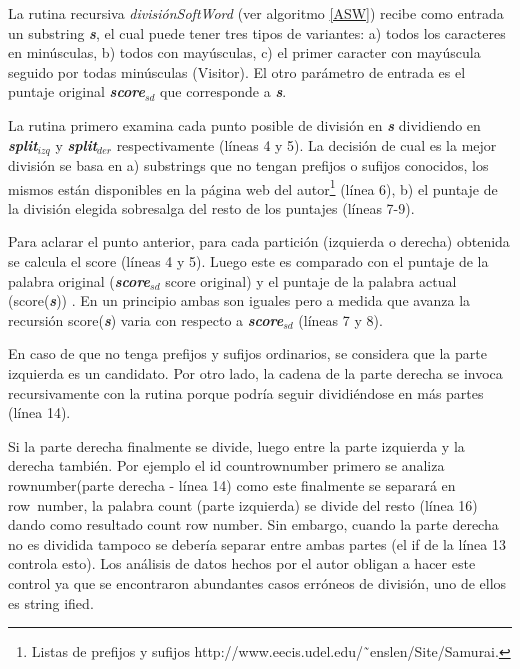 \documentclass[a4paper,12pt]{report}
\begin{document}
La rutina recursiva \textit{divisiónSoftWord} (ver algoritmo \ref{ASW}) recibe como entrada un substring \textbf{\textit{s}}, el cual puede tener tres tipos de variantes: a) todos los caracteres en minúsculas, b) todos con mayúsculas, c) el primer caracter con mayúscula seguido por todas minúsculas (\textsf{Visitor}). El otro parámetro de entrada es el puntaje original \textbf{\textit{score$_{sd}$}} que corresponde a  \textbf{\textit{s}}.

La rutina primero examina cada punto posible de división en \textbf{\textit{s}} dividiendo en \textbf{\textit{split$_{izq}$}} y \textbf{\textit{split$_{der}$}} respectivamente (líneas 4 y 5). La decisión de cual es la mejor división se basa en a) substrings que no tengan prefijos o sufijos conocidos, los mismos están disponibles en la página web del autor\footnote[1]{Listas de prefijos y sufijos  http://www.eecis.udel.edu/˜enslen/Site/Samurai.} (línea 6), b) el puntaje de la división elegida sobresalga del resto de los puntajes (líneas 7-9). 

Para aclarar el punto anterior, para cada partición (izquierda o derecha) obtenida se calcula el score (líneas 4 y 5). Luego este es comparado con el puntaje de la palabra original (\textbf{\textit{score$_{sd}$}} score original) y el puntaje de la palabra actual (score(\textbf{\textit{s}})) . En un principio ambas son iguales pero a medida que avanza la recursión score(\textbf{\textit{s}}) varia con respecto a \textbf{\textit{score$_{sd}$}} (líneas 7 y 8).

En caso de que no tenga prefijos y sufijos ordinarios, se considera que la parte izquierda es un candidato. Por otro lado, la cadena de la parte derecha se invoca recursivamente con la rutina porque podría seguir dividiéndose en más partes (línea 14).

Si la parte derecha finalmente se divide, luego entre la parte izquierda y la derecha también. Por ejemplo el id \textsf{countrownumber} primero se analiza \textsf{rownumber}(parte derecha - línea 14) como este finalmente se separará en \mbox{\textsf{row number}}, la palabra \textsf{count} (parte izquierda) se divide del resto (línea 16) dando como resultado \textsf{count row number}. Sin embargo, cuando la parte derecha no es dividida tampoco se debería separar entre ambas partes (el \textsf{if} de la línea 13 controla esto). Los análisis de datos hechos por el autor \cite{EHPV09} obligan a hacer este control ya que se encontraron abundantes casos erróneos de división, uno de ellos es \textsf{string ified}. 
\end{document}
